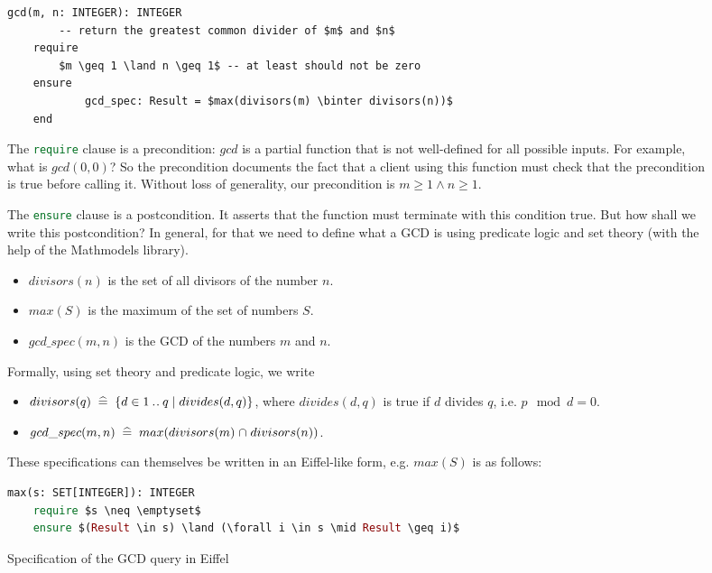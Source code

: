 \documentclass[runningheads,12pt]{article}
\newcommand{\e}[1]{\lstinline[language=eiffel]|#1|}
\begin{document}
\begin{figure}[!htb]
\begin{framed}
\lstset{language=eiffel}    
\begin{lstlisting} 
gcd(m, n: INTEGER): INTEGER
		-- return the greatest common divider of $m$ and $n$
	require
		$m \geq 1 \land n \geq 1$ -- at least should not be zero
	ensure 
			gcd_spec: Result = $max(divisors(m) \binter divisors(n))$
	end
\end{lstlisting}
\end{framed}

The \e{require} clause is a precondition: $gcd$ is a partial function that is not well-defined for all possible inputs. For example, what is $gcd(0,0)$? So the precondition documents the fact that a client using this function must check that the precondition is true before calling it. Without loss of generality, our precondition is $m \geq 1 \land n \geq 1$.

\smallskip
The \e{ensure} clause is a postcondition. It asserts that the function must terminate with this condition true. But how shall we write this postcondition? In general, for that we need to define what a GCD is using predicate logic and set theory (with the help of the Mathmodels library).  

\begin{itemize}
  \item $divisors(n)$ is the set of all divisors of the number $n$. 
  \item $max(S)$ is the maximum of the set of numbers $S$. 
  \item $gcd\_spec(m,n)$ is the GCD of the numbers $m$ and $n$.
\end{itemize}

Formally, using set theory and predicate logic, we write

\begin{itemize}
  \item $divisors(q) \;\mathrel{\widehat=}\; \{d \in 1 \mathbin{.\mkern1mu.} q \mid divides(d, q)\}$, where $divides(d, q)$ is true if $d$ divides $q$, i.e. $p \mod d = 0$. 
  \item $gcd\_spec(m,n) \;\mathrel{\widehat=}\; max(divisors(m) \mathbin{\mkern1mu\cap\mkern1mu} divisors(n))$.
\end{itemize}

These specifications can themselves be written in an Eiffel-like form, e.g. $max(S)$ is as follows:

\begin{framed}
\begin{lstlisting}[language=eiffel]
max(s: SET[INTEGER]): INTEGER
	require $s \neq \emptyset$
	ensure $(Result \in s) \land (\forall i \in s \mid Result \geq i)$
\end{lstlisting}
\end{framed}
\caption{Specification of the GCD query in Eiffel}
\label{fig:gcd-spec}
\end{figure}
\end{document}

